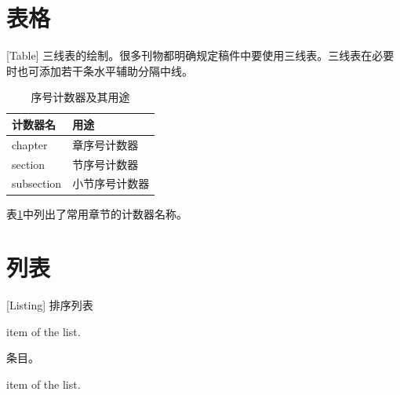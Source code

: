\section{表格}[Table]
三线表的绘制。很多刊物都明确规定稿件中要使用三线表。三线表在必要时也可添加若干条水平辅助分隔中线。
\begin{table}[!ht]
\centering
\caption{序号计数器及其用途\label{tab:2-1}}
\begin{tabular}{@{}ll@{}}
\toprule[1pt]
计数器名   & 用途            \\ \midrule
chapter    & 章序号计数器    \\
section    & 节序号计数器    \\
subsection & 小节序号计数器  \\
\bottomrule[1pt]
\end{tabular}
\end{table}

表\ref{tab:2-1}中列出了常用章节的计数器名称。

\section{列表}[Listing]
排序列表
\begin{listParentheses}
  \item item of the list.
  \item 条目。
  \item item of the list.
\end{listParentheses}


